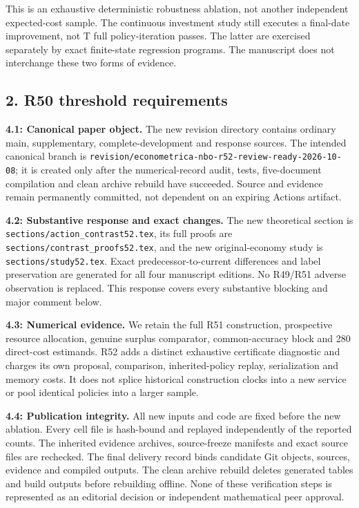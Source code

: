 \documentclass[ecta,nameyear,draft]{econsocart}
\begin{document}
This is an exhaustive deterministic robustness ablation, not another
independent expected-cost sample. The continuous investment study still
executes a final-date improvement, not T full policy-iteration passes.
The latter are exercised separately by exact finite-state regression
programs. The manuscript does not interchange these two forms of
evidence.

\hypertarget{r50-threshold-requirements}{%
\subsection{2. R50 threshold
requirements}\label{r50-threshold-requirements}}

\textbf{4.1: Canonical paper object.} The new revision directory
contains ordinary main, supplementary, complete-development and response
sources. The intended canonical branch is
\nolinkurl{revision/econometrica-nbo-r52-review-ready-2026-10-08}; it is
created only after the numerical-record audit, tests, five-document
compilation and clean archive rebuild have succeeded. Source and
evidence remain permanently committed, not dependent on an expiring
Actions artifact.

\textbf{4.2: Substantive response and exact changes.} The new
theoretical section is \nolinkurl{sections/action_contrast52.tex}, its
full proofs are \nolinkurl{sections/contrast_proofs52.tex}, and the new
original-economy study is \nolinkurl{sections/study52.tex}. Exact
predecessor-to-current differences and label preservation are generated
for all four manuscript editions. No R49/R51 adverse observation is
replaced. This response covers every substantive blocking and major
comment below.

\textbf{4.3: Numerical evidence.} We retain the full R51 construction,
prospective resource allocation, genuine surplus comparator,
common-accuracy block and 280 direct-cost estimands. R52 adds a distinct
exhaustive certificate diagnostic and charges its own proposal,
comparison, inherited-policy replay, serialization and memory costs. It
does not splice historical construction clocks into a new service or
pool identical policies into a larger sample.

\textbf{4.4: Publication integrity.} All new inputs and code are fixed
before the new ablation. Every cell file is hash-bound and replayed
independently of the reported counts. The inherited evidence archives,
source-freeze manifests and exact source files are rechecked. The final
delivery record binds candidate Git objects, sources, evidence and
compiled outputs. The clean archive rebuild deletes generated tables and
build outputs before rebuilding offline. None of these verification
steps is represented as an editorial decision or independent
mathematical peer approval.
\end{document}
